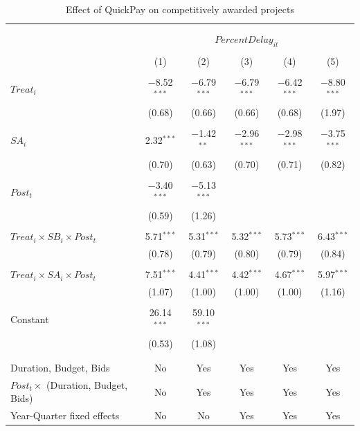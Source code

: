 \documentclass[
]{article}
\begin{document}
\begin{table}[H] \centering 
  \caption{Effect of QuickPay on competitively awarded projects} 
  \label{} 
\small 
\begin{tabular}{@{\extracolsep{-2pt}}lccccc} 
\\[-1.8ex]\hline 
\hline \\[-1.8ex] 
\\[-1.8ex] & \multicolumn{5}{c}{$PercentDelay_{it}$  } \\ 
\\[-1.8ex] & (1) & (2) & (3) & (4) & (5)\\ 
\hline \\[-1.8ex] 
 $Treat_i$ & $-$8.52$^{***}$ & $-$6.79$^{***}$ & $-$6.79$^{***}$ & $-$6.42$^{***}$ & $-$8.80$^{***}$ \\ 
  & (0.68) & (0.66) & (0.66) & (0.68) & (1.97) \\ 
  & & & & & \\ 
 $SA_i$ & 2.32$^{***}$ & $-$1.42$^{**}$ & $-$2.96$^{***}$ & $-$2.98$^{***}$ & $-$3.75$^{***}$ \\ 
  & (0.70) & (0.63) & (0.70) & (0.71) & (0.82) \\ 
  & & & & & \\ 
 $Post_t$ & $-$3.40$^{***}$ & $-$5.13$^{***}$ &  &  &  \\ 
  & (0.59) & (1.26) &  &  &  \\ 
  & & & & & \\ 
 $Treat_i \times SB_i \times Post_t$ & 5.71$^{***}$ & 5.31$^{***}$ & 5.32$^{***}$ & 5.73$^{***}$ & 6.43$^{***}$ \\ 
  & (0.78) & (0.79) & (0.80) & (0.79) & (0.84) \\ 
  & & & & & \\ 
 $Treat_i \times SA_i \times Post_t$ & 7.51$^{***}$ & 4.41$^{***}$ & 4.42$^{***}$ & 4.67$^{***}$ & 5.97$^{***}$ \\ 
  & (1.07) & (1.00) & (1.00) & (1.00) & (1.16) \\ 
  & & & & & \\ 
 Constant & 26.14$^{***}$ & 59.10$^{***}$ &  &  &  \\ 
  & (0.53) & (1.08) &  &  &  \\ 
  & & & & & \\ 
\hline \\[-1.8ex] 
Duration, Budget, Bids & No & Yes & Yes & Yes & Yes \\ 
$Post_t \times $  (Duration, Budget, Bids) & No & Yes & Yes & Yes & Yes \\ 
Year-Quarter fixed effects & No & No & Yes & Yes & Yes \\ 

\end{tabular}
\end{table}
\end{document}
